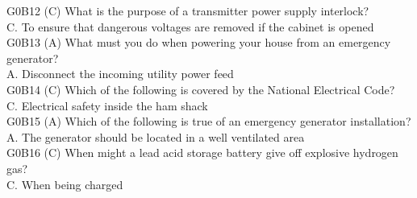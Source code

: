 \documentclass[12pt,letterpaper]{report}
\begin{document}
G0B12 (C) What is the purpose of a transmitter power supply interlock?\\
C. To ensure that dangerous voltages are removed if the cabinet is opened\\

G0B13 (A) What must you do when powering your house from an emergency generator?\\
A. Disconnect the incoming utility power feed\\

G0B14 (C) Which of the following is covered by the National Electrical Code?\\
C. Electrical safety inside the ham shack\\

G0B15 (A) Which of the following is true of an emergency generator installation?\\
A. The generator should be located in a well ventilated area \\

G0B16 (C) When might a lead acid storage battery give off explosive hydrogen gas?\\
C. When being charged\\
\end{document}
